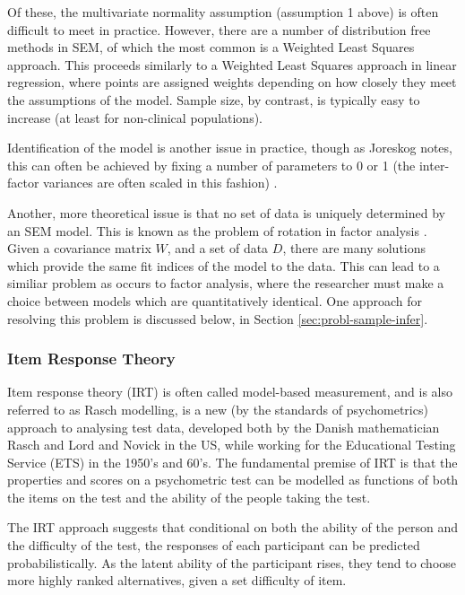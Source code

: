 Of these, the multivariate normality assumption  (assumption 1 above) is often difficult to meet in practice. However, there are a number of distribution free methods in SEM, of which the most common is a Weighted Least Squares approach. This proceeds similarly to a Weighted Least Squares approach in linear regression, where points are assigned weights depending on how closely they meet the assumptions of the model. Sample size, by contrast, is typically easy to increase (at least for non-clinical populations).

Identification of the model is another issue in practice, though as Joreskog notes, this can often be achieved by fixing a number of parameters to 0 or 1 (the inter-factor variances are often scaled in this fashion) \cite{joreskog1978structural}. 

Another, more theoretical issue is that no set of data is uniquely determined by an SEM model. This is known as the problem of rotation in factor analysis \cite{maccallum2000applications}. Given a covariance matrix $W$, and a set of data $D$, there are many solutions which provide the same fit indices of the model to the data. This can lead to a similiar problem as occurs to factor analysis, where the researcher must make a choice between models which are quantitatively identical. One approach for resolving this problem is discussed below, in Section \ref{sec:probl-sample-infer}. 

\subsubsection{Item Response Theory}

Item response theory (IRT) is often called model-based measurement\cite{fischer1995rasch}, and is also referred to as Rasch modelling, is a new (by the standards of psychometrics) approach to analysing test data, developed both by the Danish mathematician Rasch and Lord and Novick in the US, while working for the Educational Testing Service (ETS) in the 1950's and 60's\cite{van1997handbook}. 
The fundamental premise of IRT is that the properties and scores on a psychometric test can be modelled as functions of both the items on the test and the ability of the people taking the test. 

The IRT approach suggests that conditional on both the ability of the person and the difficulty of the test, the responses of each participant can be predicted probabilistically. As the latent ability of the participant rises, they tend to choose more highly ranked alternatives, given a set difficulty of item. 

